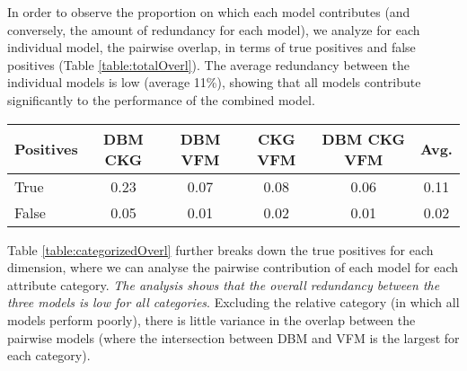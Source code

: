 \documentclass[11pt,a4paper]{article}
\begin{document}
In order to observe the proportion on which each model contributes (and conversely, the amount of redundancy for each model), we analyze for each individual model, the pairwise overlap, in terms of true positives and false positives (Table \ref{table:totalOverl}). The average redundancy between the individual models is low (average 11\%), showing that all models contribute significantly to the performance of the combined model. 

\begin{table*}[!htb]
    \centering
    \begin{center}
        \begin{tabularx}{\textwidth}{|X|c|c|c|c|c|}
            \hline
            \textbf{Positives} & \textbf{DBM}  \textbf{CKG} & \textbf{DBM}  \textbf{VFM} & \textbf{CKG}  \textbf{VFM} & \textbf{DBM}  \textbf{CKG}  \textbf{VFM} & \textbf{Avg.}\\
            \hline
            True & 0.23 & 0.07 & 0.08 & 0.06  & 0.11 \\
            False & 0.05 & 0.01 & 0.02 & 0.01  & 0.02 \\
            \hline
        \end{tabularx}
    \end{center}
    \caption{Overlap between the components relative to the combined model.}
    \label{table:totalOverl}
\end{table*}

Table \ref{table:categorizedOverl} further breaks down the true positives for each dimension, where we can analyse the pairwise contribution of each model for each attribute category. \textit{The analysis shows that the overall redundancy between the three models is low for all categories}. Excluding the relative category (in which all models perform poorly), there is little variance in the overlap between the pairwise models (where the intersection between DBM and VFM is the largest for each category). 
\end{document}
